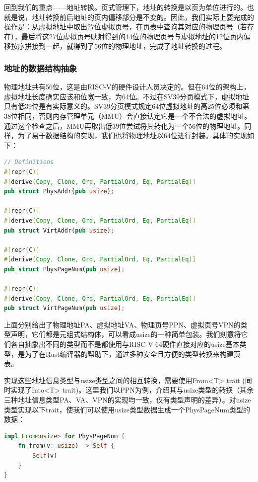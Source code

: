 回到我们的重点——地址转换。页式管理下，地址的转换是以页为单位进行的。也就是说，地址转换前后地址的页内偏移部分是不变的。因此，我们实际上要完成的操作是：从虚拟地址中取出27位虚拟页号，在页表中查询其对应的物理页号（若存在），最后将这27位虚拟页号映射得到的44位的物理页号与虚拟地址的12位页内偏移按序拼接到一起，就得到了56位的物理地址，完成了地址转换的过程。

\subsubsection{地址的数据结构抽象}

物理地址共有56位，这是由RISC-V的硬件设计人员决定的。但在64位的架构上，虚拟地址长度确实应该和位宽一致，为64位。不过在SV39分页模式下，虚拟地址只有低39位是有实际意义的。SV39分页模式规定64位虚拟地址的高25位必须和第38位相同，否则内存管理单元（MMU）会直接认定它是一个不合法的虚拟地址。通过这个检查之后，MMU再取出低39位尝试将其转化为一个56位的物理地址。同样，为了易于数据结构的实现，我们也将物理地址以64位进行封装。具体的实现如下：

\begin{lstlisting}[language={Rust}, label={code:address},
		caption={os/src/mm/address.rs}]
// Definitions
#[repr(C)]
#[derive(Copy, Clone, Ord, PartialOrd, Eq, PartialEq)]
pub struct PhysAddr(pub usize);

#[repr(C)]
#[derive(Copy, Clone, Ord, PartialOrd, Eq, PartialEq)]
pub struct VirtAddr(pub usize);
	
#[repr(C)]
#[derive(Copy, Clone, Ord, PartialOrd, Eq, PartialEq)]
pub struct PhysPageNum(pub usize);

#[repr(C)]
#[derive(Copy, Clone, Ord, PartialOrd, Eq, PartialEq)]
pub struct VirtPageNum(pub usize);
\end{lstlisting}

上面分别给出了物理地址PA、虚拟地址VA、物理页号PPN、虚拟页号VPN的类型声明，它们都是元组式结构体，可以看成usize的一种简单包装。我们刻意将它们各自抽象出不同的类型而不是都使用与RISC-V 64硬件直接对应的usize基本类型，是为了在Rust编译器的帮助下，通过多种安全且方便的类型转换来构建页表。

实现这些地址信息类型与usize类型之间的相互转换，需要使用From<T> trait (同时实现了Into<T> trait)。这里我们以PPN为例，介绍其与usize类型的转换（其余三种地址信息类型PA、VA、VPN的实现均一致，仅有类型声明的差异）。对usize类型实现以下trait，使我们可以使用usize类型数据生成一个PhysPageNum类型的数据：

\begin{lstlisting}[language={Rust}, label={code:address},
	caption={os/src/mm/address.rs}]
impl From<usize> for PhysPageNum {
	fn from(v: usize) -> Self {
		Self(v)
	}
}
\end{lstlisting}

